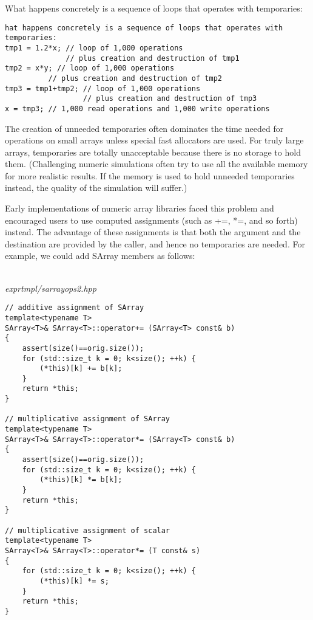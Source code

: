 What happens concretely is a sequence of loops that operates with temporaries:

\begin{lstlisting}[style=styleCXX]
hat happens concretely is a sequence of loops that operates with temporaries:
tmp1 = 1.2*x; // loop of 1,000 operations
			  // plus creation and destruction of tmp1
tmp2 = x*y; // loop of 1,000 operations
		  // plus creation and destruction of tmp2
tmp3 = tmp1+tmp2; // loop of 1,000 operations
				  // plus creation and destruction of tmp3
x = tmp3; // 1,000 read operations and 1,000 write operations
\end{lstlisting}

The creation of unneeded temporaries often dominates the time needed for operations on small arrays unless special fast allocators are used. For truly large arrays, temporaries are totally unacceptable because there is no storage to hold them. (Challenging numeric simulations often try to use all the available memory for more realistic results. If the memory is used to hold unneeded temporaries instead, the quality of the simulation will suffer.)

Early implementations of numeric array libraries faced this problem and encouraged users to use computed assignments (such as +=, *=, and so forth) instead. The advantage of these assignments is that both the argument and the destination are provided by the caller, and hence no temporaries are needed. For example, we could add SArray members as follows:

\hspace*{\fill} \\ %
\noindent
\textit{exprtmpl/sarrayops2.hpp}
\begin{lstlisting}[style=styleCXX]
// additive assignment of SArray
template<typename T>
SArray<T>& SArray<T>::operator+= (SArray<T> const& b)
{
	assert(size()==orig.size());
	for (std::size_t k = 0; k<size(); ++k) {
		(*this)[k] += b[k];
	}
	return *this;
}

// multiplicative assignment of SArray
template<typename T>
SArray<T>& SArray<T>::operator*= (SArray<T> const& b)
{
	assert(size()==orig.size());
	for (std::size_t k = 0; k<size(); ++k) {
		(*this)[k] *= b[k];
	}
	return *this;
}

// multiplicative assignment of scalar
template<typename T>
SArray<T>& SArray<T>::operator*= (T const& s)
{
	for (std::size_t k = 0; k<size(); ++k) {
		(*this)[k] *= s;
	}
	return *this;
}
\end{lstlisting}

